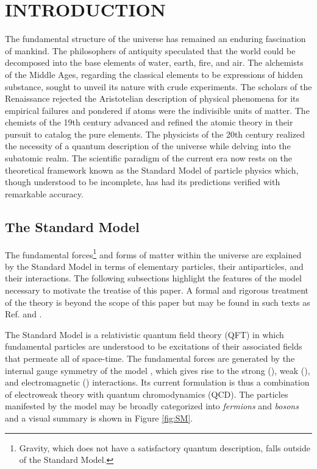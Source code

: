 \chapter{INTRODUCTION} \label{intro}

The fundamental structure of the universe has remained an enduring fascination of mankind. The philosophers of antiquity speculated that the world could be decomposed into the base elements of water, earth, fire, and air. The alchemists of the Middle Ages, regarding the classical elements to be expressions of hidden substance, sought to unveil its nature with crude experiments. The scholars of the Renaissance rejected the Aristotelian description of physical phenomena for its empirical failures and pondered if atoms were the indivisible units of matter. The chemists of the 19th century advanced and refined the atomic theory in their pursuit to catalog the pure elements. The physicists of the 20th century realized the necessity of a quantum description of the universe while delving into the subatomic realm. The scientific paradigm of the current era now rests on the theoretical framework known as the Standard Model of particle physics which, though understood to be incomplete, has had its predictions verified with remarkable accuracy.

\section{The Standard Model}

The fundamental forces\footnote{Gravity, which does not have a satisfactory quantum description, falls outside of the Standard Model.} and forms of matter within the universe are explained by the Standard Model in terms of elementary particles, their antiparticles, and their interactions. The following subsections highlight the features of the model necessary to motivate the treatise of this paper. A formal and rigorous treatment of the theory is beyond the scope of this paper but may be found in such texts as Ref. \cite{Peskin} and \cite{Schwartz}.

The Standard Model is a relativistic quantum field theory (QFT) in which fundamental particles are understood to be excitations of their associated fields that permeate all of space-time. The fundamental forces are generated by the internal gauge symmetry of the model \symSM, which gives rise to the strong (\symSTRONG), weak (\symWEAK), and electromagnetic (\symEM) interactions. Its current formulation is thus a combination of electroweak theory with quantum chromodynamics (QCD). The particles manifested by the model may be broadly categorized into \textit{fermions} and \textit{bosons} and a visual summary is shown in Figure \ref{fig:SM}.

